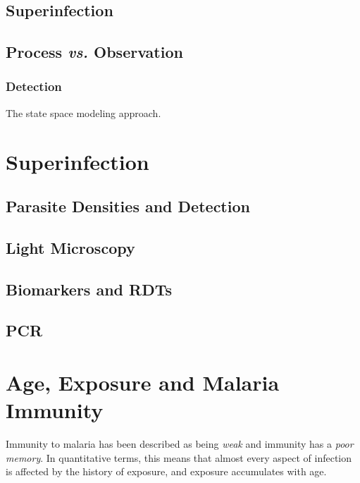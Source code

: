 \documentclass[
]{book}
\begin{document}
\section{Superinfection}\label{superinfection-2}

\section{\texorpdfstring{Process \emph{vs.} Observation}{Process vs. Observation}}\label{process-vs.-observation}

\subsection{Detection}\label{detection}

The state space modeling approach.

\chapter{Superinfection}\label{superinfection-3}

\section{Parasite Densities and Detection}\label{parasite-densities-and-detection}

\section{Light Microscopy}\label{light-microscopy}

\section{Biomarkers and RDTs}\label{biomarkers-and-rdts}

\section{PCR}\label{pcr}

\chapter{Age, Exposure and Malaria Immunity}\label{age-exposure-and-malaria-immunity}

Immunity to malaria has been described as being \emph{weak} and immunity has a \emph{poor memory}. In quantitative terms, this means that almost every aspect of infection is affected by the history of exposure, and exposure accumulates with age.
\end{document}
